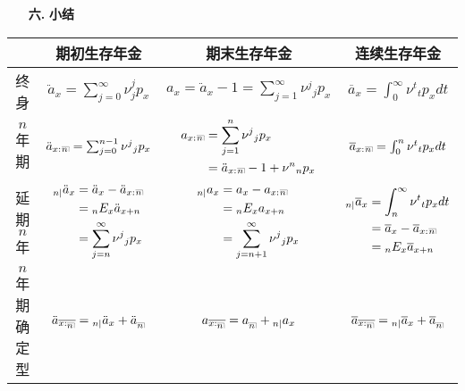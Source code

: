 \documentclass[a4paper,openany, 10pt]{ctexbook}
\makeatletter
\newcommand{\hei}{\CJKfamily{hei}}      %
\DeclareRobustCommand{\annu}[1]{_{%
    \def\arraystretch{0}%
    \setlength\arraycolsep{1pt}%
    \setlength\arrayrulewidth{.2pt}%
    \begin{array}[b]{@{}c|}\hline
        \\[\arraycolsep]%
        \scriptstyle #1%
    \end{array}%
}}
\makeatother
\begin{document}
\begin{itemize}
    \item[{\bf\hei 六.}]{\bf\hei 小结}
\end{itemize}
\begin{center}
    \begin{tabular}{ |c|c|c|c| }
        \hline
        $ $ & 期初生存年金& 期末生存年金      & 连续生存年金   \\
         \hline
        终身& $\ddot a_x=\sum_{j=0}^{\infty}{\nu^j_jp_x}$ & $a_{x}=\ddot a_{x}-1=\sum^{\infty}_{j=1}\nu^{j}{}_jp_x$      & $\overline{a}_{x}=\int_0^{\infty} \nu^t{}_{t}p_xdt$           \\
        \hline
          $n$年期& $\ddot a_{x:}{}{\annu n}=\sum_{j=0}^{n-1}{\nu^j}{}_j p_x$ & $ \begin{aligned}
          a_{x:}{}\annu n&=\sum^{n}_{j=1}\nu^{j}{}_jp_x\\
          &=\ddot a_{x:}{}\annu n-1+\nu^{n}{}_{n}p_x
          \end{aligned}$ & $  \overline{a}_{x:}{}\annu{n}=\int_0^{n} \nu^t{}_{t}p_xdt$  \\
           \hline
          延期$n$年& $\begin{aligned}
          _{n|}\ddot a_{x}&=\ddot a_{x}-\ddot a_{x:}{}\annu n\\
          &={}_{n}E_{x}\ddot a_{x+n}\\
          &=\sum^{\infty}_{j=n}\nu^{j}{}_{j}p_{x}\\
          \end{aligned}$ & $\begin{aligned}
 _{n|}a_{x}& = a_{x}-a_{x:}{}\annu n \\
& = {}_{n}E_{x}a_{x+n}\\
&=\sum_{j=n+1}^{\infty}\nu^{j}{}_{j}p_{x}
\end{aligned}$ & $\begin{aligned}
          {}_{n|}\overline{a}_{x}&=\int_n^{\infty} \nu^t{}_{t}p_xdt\\
          &=\overline{a}_{x}-\overline{a}_{x:}{}\annu{n}\\
          &={}_nE_x\overline{a}_{x+n}
          \end{aligned}$ \\
           \hline
          $n$年期确定型& $\ddot a_{\overline{x:\annu n}}={}_{n|}\ddot a_{x}+\ddot a_{\annu n}$ & $a_{\overline{x:\annu{n}}}=a_{\annu n} + {}_{n|}a_{x}$ & $\overline a_{\overline{x:\annu{n}}}={}_{n|}\overline{a}_{x}+\overline a_{\annu {n}}$ \\
        \hline
    \end{tabular}
\end{center}
\end{document}
